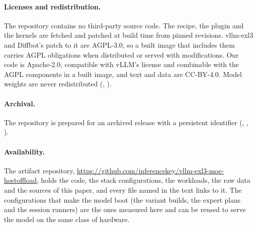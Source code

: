 \paragraph{Licenses and redistribution.}
The repository contains no third-party source code. The recipe, the plugin and the kernels are fetched and patched at
build time from pinned revisions. vllm-exl3 and Diffbot's patch to it are AGPL-3.0, so a built image that includes
them carries AGPL obligations when distributed or served with modifications. Our code is Apache-2.0, compatible with
vLLM's license and combinable with the AGPL components in a built image, and text and data are CC-BY-4.0. Model weights
are never redistributed (, ).

\paragraph{Archival.}
The repository is prepared for an archived release with a persistent identifier (,
, ).

\paragraph{Availability.}
The artifact repository, \url{https://github.com/inferencekey/vllm-exl3-moe-hostoffload}, holds the code, the
stack configurations, the workloads, the raw data and the sources of this paper, and every file named in the text
links to it. The configurations that
make the model boot (the variant builds, the expert plans and the session runners) are the ones measured here and
can be reused to serve the model on the same class of hardware.
